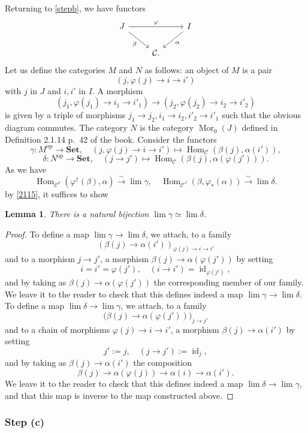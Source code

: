 \documentclass[12pt]{article}%
\newtheorem{lem}[thm]{Lemma}
\theoremstyle{remark}
\theoremstyle{definition}
\newcommand{\C}{\mathcal C}
\newcommand{\Set}{\mathbf{Set}}%
\newcommand{\pp}{\varphi}
\newcommand{\xr}{\xrightarrow}
\DeclareMathOperator{\id}{id}
\DeclareMathOperator{\Hom}{Hom}%
\DeclareMathOperator{\Mor}{Mor}
\DeclareMathOperator{\op}{op}
\begin{document}
Returning to \eqref{stepb}, we have functors 
$$
\begin{tikzcd}
J\ar{rr}{\pp}\ar{dr}[swap]{\beta}&&I\ar{dl}{\alpha}\\ 
&\C.
\end{tikzcd}
$$ 
Let us define the categories $M$ and $N$ as follows: an object of $M$ is a pair 
$$
(j,\pp(j)\to i\to i')
$$ 
with $j$ in $J$ and $i,i'$ in $I$. A morphism 
$$
(j_1,\pp(j_1)\to i_1\to i'_1)\to(j_2,\pp(j_2)\to i_2\to i'_2)
$$ 
is given by a triple of morphisms $j_1\to j_2,i_1\to i_2,i'_2\to i'_1$ such that the obvious diagram commutes. The category $N$ is the category $\Mor_0(J)$ defined in Definition 2.1.14 p.~42 of the book. Consider the functors 
$$
\gamma:M^{\op}\to\Set,\quad(j,\pp(j)\to i\to i')\mapsto\Hom_\C(\beta(j),\alpha(i')), 
$$ 
$$
\delta:N^{\op}\to\Set,\quad(j\to j')\mapsto\Hom_\C(\beta(j),\alpha(\pp(j'))). 
$$ 
As we have 
$$
\Hom_{\C^I}(\pp^\dagger(\beta),\alpha)\xr\sim\lim\gamma,\quad
\Hom_{\C^J}(\beta,\pp_*(\alpha))\xr\sim\lim\delta. 
$$ 
by \eqref{2115}, it suffices to show 
%
\begin{lem}
%
There is a natural bijection $\lim\gamma\simeq\lim\delta$. 
%
\end{lem} 
%
\begin{proof}
To define a map $\lim\gamma\to\lim\delta$, we attach, to a family 
$$
(\beta(j)\to\alpha(i'))_{\pp(j)\to i\to i'}
$$ 
and to a morphism $j\to j'$, a morphism $\beta(j)\to\alpha(\pp(j'))$ by setting 
$$
i=i'=\pp(j'),\quad(i\to i')=\id_{\pp(j')},
$$ 
and by taking as $\beta(j)\to\alpha(\pp(j'))$ the corresponding member of our family. We leave it to the reader to check that this defines indeed a map $\lim\gamma\to\lim\delta$. To define a map $\lim\delta\to\lim\gamma$, we attach, to a family 
$$
\big(\beta(j)\to\alpha(\pp(j'))\big)_{j\to j'}
$$ 
and to a chain of morphisms $\pp(j)\to i\to i'$, a morphism $\beta(j)\to\alpha(i')$ by setting 
$$
j':=j,\quad(j\to j'):=\id_{j},
$$ 
and by taking as $\beta(j)\to\alpha(i')$ the composition 
$$
\beta(j)\to\alpha(\pp(j))\to\alpha(i)\to\alpha(i'). 
$$ 
We leave it to the reader to check that this defines indeed a map $\lim\delta\to\lim\gamma$, and that this map is inverse to the map constructed above.
\end{proof}
%
\subsubsection{Step (c)}
\end{document}
